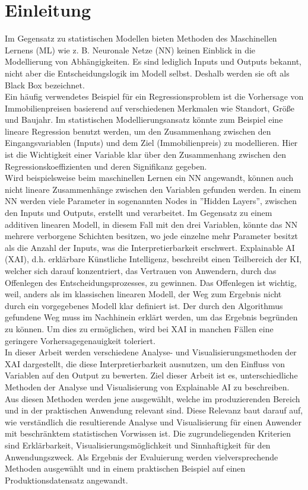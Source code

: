 \documentclass[12pt,titlepage,oneside]{book}
\begin{document}
\chapter{Einleitung} \label{intro}
Im Gegensatz zu statistischen Modellen bieten Methoden des Maschinellen Lernens (ML) wie z. B. Neuronale Netze (NN) keinen Einblick in die Modellierung von Abhängigkeiten. Es sind lediglich Inputs und Outputs bekannt, nicht aber die Entscheidungslogik im Modell selbst. Deshalb werden sie oft als Black Box bezeichnet. \\
Ein häufig verwendetes Beispiel für ein Regressionsproblem ist die Vorhersage von Immobilienpreisen basierend auf verschiedenen Merkmalen wie Standort, Größe und Baujahr. Im statistischen Modellierungsansatz könnte zum Beispiel eine lineare Regression benutzt werden, um den Zusammenhang zwischen den Eingangsvariablen (Inputs) und dem Ziel (Immobilienpreis) zu modellieren. Hier ist die Wichtigkeit einer Variable klar über den Zusammenhang zwischen den Regressionskoeffizienten und deren Signifikanz gegeben.\\ Wird beispielsweise beim maschinellen Lernen ein NN angewandt, können auch nicht lineare Zusammenhänge zwischen den Variablen gefunden werden. In einem NN werden viele Parameter in sogenannten Nodes in ''Hidden Layers'', zwischen den Inputs und Outputs, erstellt und verarbeitet. Im Gegensatz zu einem additiven linearen Modell, in diesem Fall mit den drei Variablen, könnte das NN mehrere verborgene Schichten besitzen, wo jede einzelne mehr Parameter besitzt als die Anzahl der Inputs, was die Interpretierbarkeit erschwert. Explainable AI (XAI), d.h. erklärbare Künstliche Intelligenz, beschreibt einen Teilbereich der KI, welcher sich darauf konzentriert, das Vertrauen von Anwendern, durch das Offenlegen des Entscheidungsprozesses, zu gewinnen. Das Offenlegen ist wichtig, weil, anders als im klassischen linearen Modell, der Weg zum Ergebnis nicht durch ein vorgegebenes Modell klar definiert ist. Der durch den Algorithmus gefundene Weg muss im Nachhinein erklärt werden, um das Ergebnis begründen zu können. Um dies zu ermöglichen, wird bei XAI in manchen Fällen eine geringere Vorhersagegenauigkeit toleriert.\\
In dieser Arbeit werden verschiedene Analyse- und Visualisierungsmethoden der XAI dargestellt, die diese Interpretierbarkeit ausnutzen, um den Einfluss von Variablen auf den Output zu bewerten. Ziel dieser Arbeit ist es, unterschiedliche Methoden der Analyse und Visualisierung von Explainable AI zu beschreiben. Aus diesen Methoden werden jene ausgewählt, welche im produzierenden Bereich und in der praktischen Anwendung relevant sind. Diese Relevanz baut darauf auf, wie verständlich die resultierende Analyse und Visualisierung für einen Anwender mit beschränktem statistischen Vorwissen ist. Die zugrundeliegenden Kriterien sind Erklärbarkeit, Visualisierungsmöglichkeit und Sinnhaftigkeit für den Anwendungszweck. Als Ergebnis der Evaluierung werden vielversprechende Methoden ausgewählt und in einem praktischen Beispiel auf einen Produktionsdatensatz angewandt. 
\end{document}
